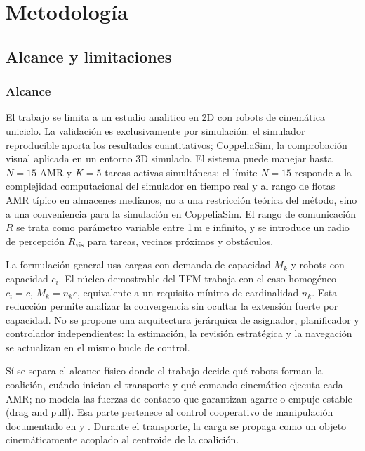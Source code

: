 \section{Metodología}
\label{sec:metodologia}

\subsection{Alcance y limitaciones}
\label{sec:alcance}

\subsubsection{Alcance}

El trabajo se limita a un estudio analitico en 2D con robots de cinemática uniciclo. La validación
es exclusivamente por simulación: el simulador reproducible aporta los resultados cuantitativos; CoppeliaSim,
la comprobación visual aplicada en un entorno 3D simulado. El sistema puede manejar hasta
$N = 15$ AMR y $K = 5$ tareas activas simultáneas; el límite $N = 15$ responde
a la complejidad computacional del simulador en tiempo real y al rango de
flotas AMR típico en almacenes medianos, no a una restricción teórica del método, sino a una conveniencia para la simulación en CoppeliaSim.
El rango de comunicación $R$ se trata como parámetro variable entre 1\,m e infinito, y
se introduce un radio de percepción $R_{\mathrm{vis}}$ para tareas, vecinos próximos y
obstáculos.

La formulación general usa cargas con demanda de capacidad $M_k$ y robots con capacidad
$c_i$. El núcleo demostrable del TFM trabaja con el caso homogéneo
$c_i=c$, $M_k=n_kc$, equivalente a un requisito mínimo de cardinalidad $n_k$. Esta
reducción permite analizar la convergencia sin ocultar la extensión fuerte por
capacidad. No se propone una arquitectura jerárquica de asignador, planificador y
controlador independientes: la estimación, la revisión estratégica y la navegación se
actualizan en el mismo bucle de control.

Sí se separa el alcance físico donde el trabajo decide
qué robots forman la coalición, cuándo inician el transporte y qué comando cinemático
ejecuta cada AMR; no modela las fuerzas de contacto que garantizan agarre o empuje
estable (drag and pull). Esa parte pertenece al control cooperativo de manipulación documentado en
\citet{ebel2024cooperative} y \citet{rosenfelder2024force}. Durante el transporte, la
carga se propaga como un objeto cinemáticamente acoplado al centroide de la coalición.

